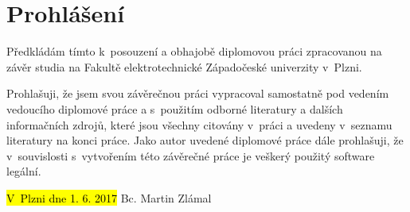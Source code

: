 \chapter*{Prohlášení}
Předkládám tímto k~posouzení a obhajobě diplomovou práci zpracovanou na závěr studia na Fakultě elektrotechnické Západočeské univerzity v~Plzni.

Prohlašuji, že jsem svou závěrečnou práci vypracoval samostatně pod vedením vedoucího diplomové práce a s~použitím odborné literatury a dalších informačních zdrojů, které jsou všechny citovány v~práci a uvedeny v~seznamu literatury na konci práce. Jako autor uvedené diplomové práce dále prohlašuji, že v~souvislosti s~vytvořením této závěrečné práce je veškerý použitý software legální.

\hfill \namesig

\vfill
\hl{V~Plzni dne 1. 6. 2017}
\hfill Bc. Martin Zlámal
